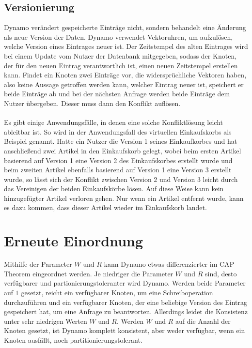 \subsection{Versionierung}
Dynamo verändert gespeicherte Einträge nicht, sondern behandelt eine Änderung als neue Version der Daten. Dynamo verwendet Vektoruhren, um aufzulösen, welche Version eines Eintrages neuer ist. Der Zeitstempel des alten Eintrages wird bei einem Update vom Nutzer der Datenbank mitgegeben, sodass der Knoten, der für den neuen Eintrag verantwortlich ist, einen neuen Zeitstempel erstellen kann. Findet ein Knoten zwei Einträge vor, die widersprüchliche Vektoren haben, also keine Aussage getroffen werden kann, welcher Eintrag neuer ist, speichert er beide Einträge ab und bei der nächsten Anfrage werden beide Einträge dem Nutzer übergeben. Dieser muss dann den Konflikt auflösen. \\
\\
Es gibt einige Anwendungsfälle, in denen eine solche Konfliktlösung leicht ableitbar ist. So wird in \cite{dynamo} der Anwendungsfall des virtuellen Einkaufskorbs als Beispiel genannt. Hatte ein Nutzer die Version 1 seines Einkaufkorbes und hat anschließend zwei Artikel in den Einkaufskorb gelegt, wobei beim ersten Artikel basierend auf Version 1 eine Version 2 des Einkaufskorbes erstellt wurde und beim zweiten Artikel ebenfalls basierend auf Version 1 eine Version 3 erstellt wurde, so lässt sich der Konflikt zwischen Version 2 und Version 3 leicht durch das Vereinigen der beiden Einkaufskörbe lösen. Auf diese Weise kann kein hinzugefügter Artikel verloren gehen. Nur wenn ein Artikel entfernt wurde, kann es dazu kommen, dass dieser Artikel wieder im Einkaufskorb landet.
\section{Erneute Einordnung}
Mithilfe der Parameter $W$ und $R$ kann Dynamo etwas differenzierter im CAP-Theorem eingeordnet werden. Je niedriger die Parameter $W$ und $R$ sind, desto verfügbarer und partionierungstoleranter wird Dynamo. Werden beide Parameter auf $1$ gesetzt, reicht ein verfügbarer Knoten, um eine Schreiboperation durchzuführen und ein verfügbarer Knoten, der eine beliebige Version des Eintrag gespeichert hat, um eine Anfrage zu beantworten. Allerdings leidet die Konsistenz unter sehr niedrigen Werten $W$ und $R$. Werden $W$ und $R$ auf die Anzahl der Knoten gesetzt, ist Dynamo komplett konsistent, aber weder verfügbar, wenn ein Knoten ausfällt, noch partitionierungstolerant.